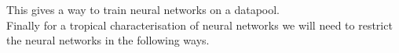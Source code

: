 \documentclass{article}
\theoremstyle{definition}
\newtheorem{comment}[theorem]{Comment}
\newtheorem{remark}[theorem]{Remark}
\begin{document}

This gives a way to train neural networks on a datapool. \\

Finally for a tropical characterisation of neural networks we will need to restrict the neural networks in the following ways.

\end{document}
